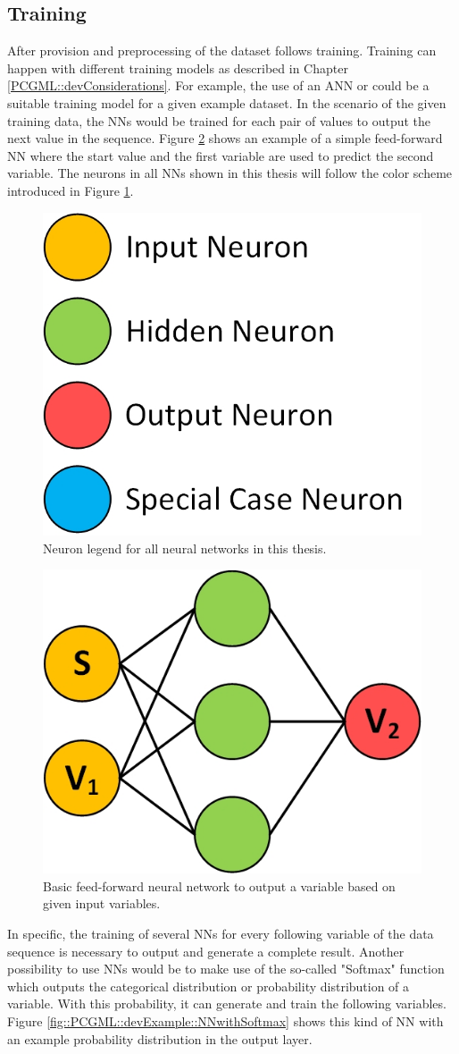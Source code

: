 \documentclass[MGS,Master,english]{twbook}%
\begin{document}
\subsection{Training}
After provision and preprocessing of the dataset follows training. Training can happen with different training models as described in Chapter \ref{PCGML::devConsiderations}. For example, the use of an ANN or could be a suitable training model for a given example dataset. In the scenario of the given training data, the \acp{NN} would be trained for each pair of values to output the next value in the sequence. Figure \ref{fig::PCGML::devExample::NNbasic} shows an example of a simple feed-forward \ac{NN} where the start value and the first variable are used to predict the second variable. The neurons in all \acp{NN} shown in this thesis will follow the color scheme introduced in Figure \ref{fig::neuron_legend}. 
\begin{figure}[!htbp]
	\centering
	\includegraphics[width=0.3\linewidth]{PICs/NNs/neurons_legend.jpg}
	\caption{Neuron legend for all neural networks in this thesis.}\label{fig::neuron_legend}
\end{figure}
\begin{figure}[!htbp]
	\centering
	\includegraphics[width=0.3\linewidth]{PICs/NNs/PCGML_development_example_NN_basic}
	\caption{Basic feed-forward neural network to output a variable based on given input variables.}\label{fig::PCGML::devExample::NNbasic}
\end{figure}
In specific, the training of several \acp{NN} for every following variable of the data sequence is necessary to output and generate a complete result. Another possibility to use \acp{NN} would be to make use of the so-called "Softmax" function which outputs the categorical distribution or probability distribution of a variable. With this probability, it can generate and train the following variables. Figure \ref{fig::PCGML::devExample::NNwithSoftmax} shows this kind of NN with an example probability distribution in the output layer.
\end{document}
